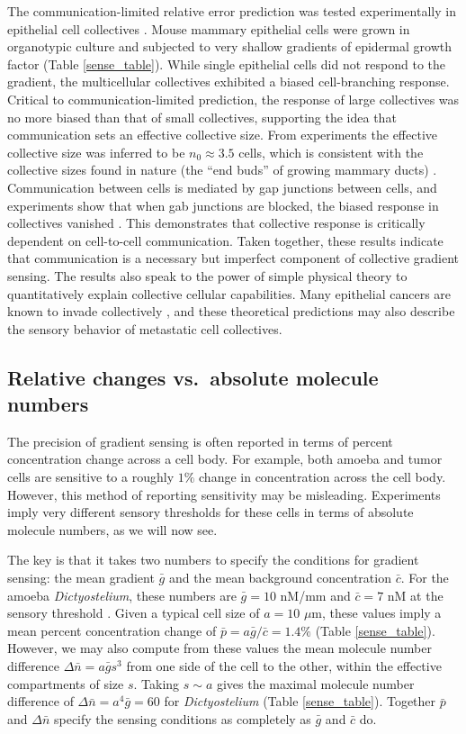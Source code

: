The communication-limited relative error prediction was tested experimentally in epithelial cell collectives \cite{ellison2016cell}. Mouse mammary epithelial cells were grown in organotypic culture and subjected to very shallow gradients of epidermal growth factor (Table \ref{sense_table}). While single epithelial cells did not respond to the gradient, the multicellular collectives exhibited a biased cell-branching response. Critical to communication-limited prediction, the response of large collectives was no more biased than that of small collectives, supporting the idea that communication sets an effective collective size. From experiments the effective collective size was inferred to be $n_0 \approx 3.5$ cells, which is consistent with the collective sizes found in nature (the ``end buds'' of growing mammary ducts) \cite{lu2008genetic}.
Communication between cells is mediated by gap junctions between cells, and experiments show that when gab junctions are blocked, the biased response in collectives vanished \cite{ellison2016cell}. This demonstrates that collective response is critically dependent on cell-to-cell communication. Taken together, these results indicate that communication is a necessary but imperfect component of collective gradient sensing. The results also speak to the power of simple physical theory to quantitatively explain collective cellular capabilities. Many epithelial cancers are known to invade collectively \cite{cheung2013collective}, and these theoretical predictions may also describe the sensory behavior of metastatic cell collectives.


\subsection{Relative changes vs.\ absolute molecule numbers}

The precision of gradient sensing is often reported in terms of percent concentration change across a cell body. For example, both amoeba \cite{van2007biased} and tumor cells \cite{shields2007autologous} are sensitive to a roughly $1\%$ change in concentration across the cell body. However, this method of reporting sensitivity may be misleading. Experiments imply very different sensory thresholds for these cells in terms of absolute molecule numbers, as we will now see.

The key is that it takes two numbers to specify the conditions for gradient sensing: the mean gradient $\bar{g}$ and the mean background concentration $\bar{c}$. For the amoeba \textit{Dictyostelium}, these numbers are $\bar{g} = 10$ nM/mm and $\bar{c} = 7$ nM at the sensory threshold \cite{van2007biased}. Given a typical cell size of $a = 10$ $\mu$m, these values imply a mean percent concentration change of $\bar{p} = a\bar{g}/\bar{c} = 1.4\%$ (Table \ref{sense_table}). However, we may also compute from these values the mean molecule number difference
$\Delta\bar{n} = a\bar{g}s^3$
from one side of the cell to the other, within the effective compartments of size $s$. Taking $s\sim a$ gives the maximal molecule number difference of $\Delta\bar{n} = a^4\bar{g} = 60$
for \textit{Dictyostelium} (Table \ref{sense_table}). Together $\bar{p}$ and $\Delta\bar{n}$ specify the sensing conditions as completely as $\bar{g}$ and $\bar{c}$ do.

